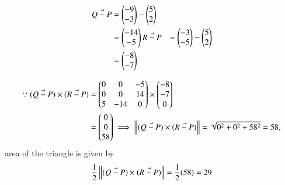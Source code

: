 \begin{align} \label{2/2/3eq1}
\Vec{Q-P} & =\begin{pmatrix}-9 \\-3 \\\end{pmatrix} -\begin{pmatrix}5 \\2\end{pmatrix}\\
 & = \begin{pmatrix}-14 \\ -5\end{pmatrix}
 \label{2/2/3eq2}
\Vec{R-P} & =\begin{pmatrix}-3 \\-5 \end{pmatrix} -\begin{pmatrix}5 \\2\end{pmatrix}\\
 & = \begin{pmatrix}-8 \\ -7\end{pmatrix}
\end{align}




\begin{align} 
\because (\Vec{Q-P})\times ( \Vec{R-P} ) & = \begin{pmatrix}0&0&-5\\0&0&14\\5&-14&0\\\end{pmatrix} \times \begin{pmatrix}-8\\-7\\0\\\end{pmatrix}\\
 & = \begin{pmatrix}0\\0\\58\\\end{pmatrix}
\implies \left\lVert(\Vec{Q-P})\times ( \Vec{R-P} )\right\rVert =\sqrt{0^2 + 0^2+ 58^2} = 58,
\end{align}
area of the triangle is given by 
\begin{align} 
 \frac{1}{2}\left\lVert (\Vec{Q-P})\times ( \Vec{R-P} )\right\rVert = \frac{1}{2}(58) =29 
 \end{align}




